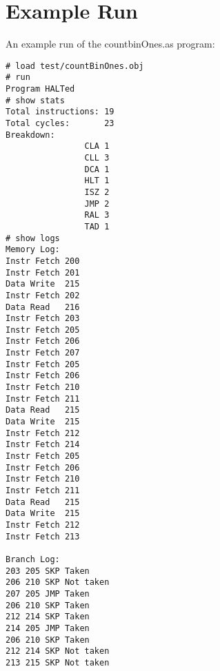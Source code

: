 \documentclass[11pt]{exam}
\begin{document}
\section{Example Run}
An example run of the countbinOnes.as program:

\begin{multicols}{2}
{\scriptsize
\begin{verbatim}
# load test/countBinOnes.obj
# run
Program HALTed
# show stats
Total instructions: 19
Total cycles:       23
Breakdown:
                CLA 1
                CLL 3
                DCA 1
                HLT 1
                ISZ 2
                JMP 2
                RAL 3
                TAD 1
# show logs
Memory Log:
Instr Fetch 200
Instr Fetch 201
Data Write  215
Instr Fetch 202
Data Read   216
Instr Fetch 203
Instr Fetch 205
Instr Fetch 206
Instr Fetch 207
Instr Fetch 205
Instr Fetch 206
Instr Fetch 210
Instr Fetch 211
Data Read   215
Data Write  215
Instr Fetch 212
Instr Fetch 214
Instr Fetch 205
Instr Fetch 206
Instr Fetch 210
Instr Fetch 211
Data Read   215
Data Write  215
Instr Fetch 212
Instr Fetch 213

Branch Log:
203 205 SKP Taken
206 210 SKP Not taken
207 205 JMP Taken
206 210 SKP Taken
212 214 SKP Taken
214 205 JMP Taken
206 210 SKP Taken
212 214 SKP Not taken
213 215 SKP Not taken
\end{verbatim}
}
\end{multicols}
\end{document}
